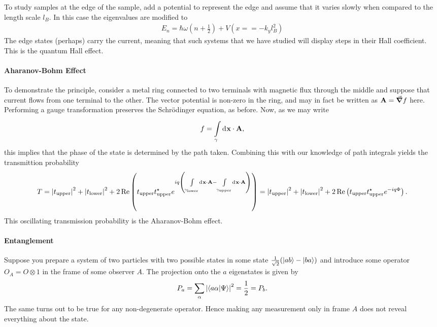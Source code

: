 To study samples at the edge of the sample, add a potential to represent the edge and assume that it varies slowly when compared to the length scale $l_{B}$. In this case the eigenvalues are modified to
\begin{align*}
	E_{n} = \hbar\omega(n + \frac{1}{2}) + V(x = = -k_{y}l_{B}^{2})
\end{align*}
The edge states (perhaps) carry the current, meaning that such systems that we have studied will display steps in their Hall coefficient. This is the quantum Hall effect.

\paragraph{Aharanov-Bohm Effect}
To demonstrate the principle, consider a metal ring connected to two terminals with magnetic flux through the middle and suppose that current flows from one terminal to the other. The vector potential is non-zero in the ring, and may in fact be written as $\vb{A} = \grad{f}$ here. Performing a gauge transformation preserves the Schrödinger equation, as before. Now, as we may write
\begin{align*}
	f = \int\limits_{\gamma}^{}\dd[]{\vb{x}}\cdot\vb{A},
\end{align*}
this implies that the phase of the state is determined by the path taken. Combining this with our knowledge of path integrals yields the transmittion probability
\begin{align*}
	T = \abs{t_{\text{upper}}}^{2} + \abs{t_{\text{lower}}}^{2} + 2\Re\left(t_{\text{upper}}t_{\text{upper}}^{\star}e^{iq\left(\int\limits_{\gamma_{\text{lower}}}^{}\dd[]{\vb{x}}\cdot\vb{A} - \int\limits_{\gamma_{\text{upper}}}^{}\dd[]{\vb{x}}\cdot\vb{A}\right)}\right) = \abs{t_{\text{upper}}}^{2} + \abs{t_{\text{lower}}}^{2} + 2\Re\left(t_{\text{upper}}t_{\text{upper}}^{\star}e^{-iq\Phi}\right).
\end{align*}
This oscillating transmission probability is the Aharanov-Bohm effect.

\paragraph{Entanglement}
Suppose you prepare a system of two particles with two possible states in some state $\frac{1}{\sqrt{2}}(\ket{ab} - \ket{ba})$ and introduce some operator $O_{A} = O\otimes 1$ in the frame of some observer $A$. The projection onto the $a$ eigenstates is given by
\begin{align*}
	P_{a} = \sum\limits_{\alpha}\abs{\braket{a\alpha}{\Psi}}^{2} = \frac{1}{2} = P_{b}.
\end{align*}
The same turns out to be true for any non-degenerate operator. Hence making any measurement only in frame $A$ does not reveal everything about the state.

